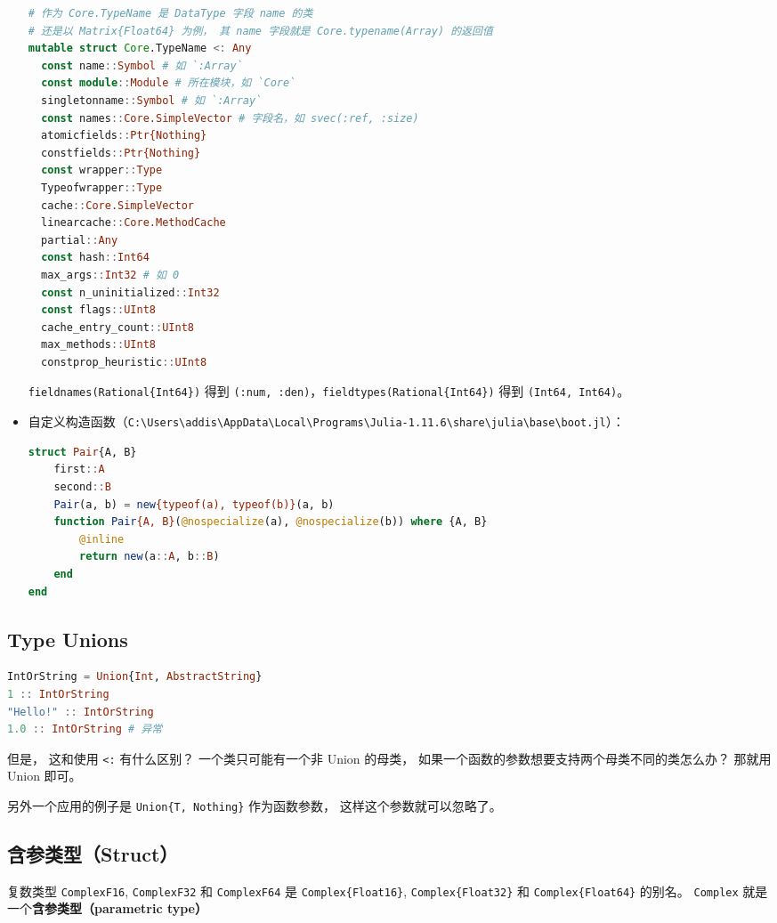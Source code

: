 \begin{itemize}
\begin{lstlisting}[language=julia]
# 作为 Core.TypeName 是 DataType 字段 name 的类
# 还是以 Matrix{Float64} 为例， 其 name 字段就是 Core.typename(Array) 的返回值
mutable struct Core.TypeName <: Any
  const name::Symbol # 如 `:Array`
  const module::Module # 所在模块，如 `Core`
  singletonname::Symbol # 如 `:Array`
  const names::Core.SimpleVector # 字段名，如 svec(:ref, :size)
  atomicfields::Ptr{Nothing}
  constfields::Ptr{Nothing}
  const wrapper::Type
  Typeofwrapper::Type
  cache::Core.SimpleVector
  linearcache::Core.MethodCache
  partial::Any
  const hash::Int64
  max_args::Int32 # 如 0
  const n_uninitialized::Int32
  const flags::UInt8
  cache_entry_count::UInt8
  max_methods::UInt8
  constprop_heuristic::UInt8
\end{lstlisting}

\verb`fieldnames(Rational{Int64})` 得到 \verb`(:num, :den)`，\verb`fieldtypes(Rational{Int64})` 得到 \verb`(Int64, Int64)`。
\item 自定义构造函数（\verb`C:\Users\addis\AppData\Local\Programs\Julia-1.11.6\share\julia\base\boot.jl`）：
\begin{lstlisting}[language=julia]
struct Pair{A, B}
    first::A
    second::B
    Pair(a, b) = new{typeof(a), typeof(b)}(a, b)
    function Pair{A, B}(@nospecialize(a), @nospecialize(b)) where {A, B}
        @inline
        return new(a::A, b::B)
    end
end
\end{lstlisting}
\end{itemize}


\subsection{Type Unions}
\begin{lstlisting}[language=julia]
IntOrString = Union{Int, AbstractString}
1 :: IntOrString
"Hello!" :: IntOrString
1.0 :: IntOrString # 异常
\end{lstlisting}
但是， 这和使用 \verb`<:` 有什么区别？ 一个类只可能有一个非 Union 的母类， 如果一个函数的参数想要支持两个母类不同的类怎么办？ 那就用 Union 即可。

另外一个应用的例子是 \verb`Union{T, Nothing}` 作为函数参数， 这样这个参数就可以忽略了。

\subsection{含参类型（Struct）}

复数类型 \verb`ComplexF16`, \verb`ComplexF32` 和 \verb`ComplexF64` 是 \verb`Complex{Float16}`, \verb`Complex{Float32}` 和 \verb`Complex{Float64}` 的别名。 \verb`Complex` 就是一个\textbf{含参类型（parametric type）}

